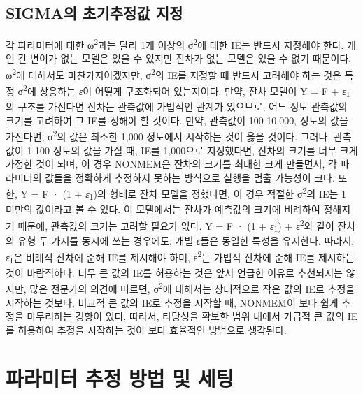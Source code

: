 \documentclass[
  10pt,
  krantz2,
  a4paper]{krantz}
\theoremstyle{definition}
\theoremstyle{definition}
\theoremstyle{definition}
\theoremstyle{remark}
\begin{document}
\hypertarget{sigmauxc758-uxcd08uxae30uxcd94uxc815uxac12-uxc9c0uxc815}{%
\section{SIGMA의 초기추정값 지정}\label{sigmauxc758-uxcd08uxae30uxcd94uxc815uxac12-uxc9c0uxc815}}

각 파라미터에 대한 ω\textsuperscript{2}과는 달리 1개 이상의 σ\textsuperscript{2}에 대한 IE는 반드시 지정해야 한다. 개인 간 변이가 없는 모델은 있을 수 있지만 잔차가 없는 모델은 있을 수 없기 때문이다. ω\textsuperscript{2}에 대해서도 마찬가지이겠지만, σ\textsuperscript{2}의 IE를 지정할 때 반드시 고려해야 하는 것은 특정 σ\textsuperscript{2}에 상응하는 \emph{ε}이 어떻게 구조화되어 있는지이다. 만약, 잔차 모델이 Y = F + \emph{ε}\textsubscript{1}의 구조를 가진다면 잔차는 관측값에 가법적인 관계가 있으므로, 어느 정도 관측값의 크기를 고려하여 그 IE를 정해야 할 것이다. 만약, 관측값이 100-10,000, 정도의 값을 가진다면, σ\textsuperscript{2}의 값은 최소한 1,000 정도에서 시작하는 것이 옳을 것이다. 그러나, 관측값이 1-100 정도의 값을 가질 때, IE를 1,000으로 지정했다면, 잔차의 크기를 너무 크게 가정한 것이 되며, 이 경우 NONMEM은 잔차의 크기를 최대한 크게 만들면서, 각 파라미터의 값들을 정확하게 추정하지 못하는 방식으로 실행을 멈출 가능성이 크다. 또한, Y = F · (1 + \emph{ε}\textsubscript{1})의 형태로 잔차 모델을 정했다면, 이 경우 적절한 σ\textsuperscript{2}의 IE는 1 미만의 값이라고 볼 수 있다. 이 모델에서는 잔차가 예측값의 크기에 비례하여 정해지기 때문에, 관측값의 크기는 고려할 필요가 없다. Y = F · (1 + \emph{ε}\textsubscript{1}) + ε\textsuperscript{2}와 같이 잔차의 유형 두 가지를 동시에 쓰는 경우에도, 개별 \emph{ε}들은 동일한 특성을 유지한다. 따라서, \emph{ε}\textsubscript{1}은 비례적 잔차에 준해 IE를 제시해야 하며, ε\textsuperscript{2}는 가법적 잔차에 준해 IE를 제시하는 것이 바람직하다. 너무 큰 값의 IE를 허용하는 것은 앞서 언급한 이유로 추천되지는 않지만, 많은 전문가의 의견에 따르면, σ\textsuperscript{2}에 대해서는 상대적으로 작은 값의 IE로 추정을 시작하는 것보다, 비교적 큰 값의 IE로 추정을 시작할 때, NONMEM이 보다 쉽게 추정을 마무리하는 경향이 있다. 따라서, 타당성을 확보한 범위 내에서 가급적 큰 값의 IE를 허용하여 추정을 시작하는 것이 보다 효율적인 방법으로 생각된다.

\hypertarget{estimation-methods}{%
\chapter{파라미터 추정 방법 및 세팅}\label{estimation-methods}}
\end{document}
